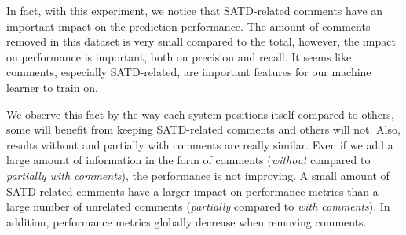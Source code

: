 
In fact, with this experiment, we notice that SATD-related comments have an important impact on the prediction performance. The amount of comments removed in this dataset is very small compared to the total, however, the impact on performance is important, both on precision and recall. It seems like comments, especially SATD-related, are important features for our machine learner to train on. 

We observe this fact by the way each system positions itself compared to others, some will benefit from keeping SATD-related comments and others will not. Also, results without and partially with comments are really similar. Even if we add a large amount of information in the form of comments (\textit{without} compared to \textit{partially with comments}), the performance is not improving. A small amount of SATD-related comments have a larger impact on performance metrics than a large number of unrelated comments (\textit{partially} compared to \textit{with comments}). In addition, performance metrics globally decrease when removing comments.



















